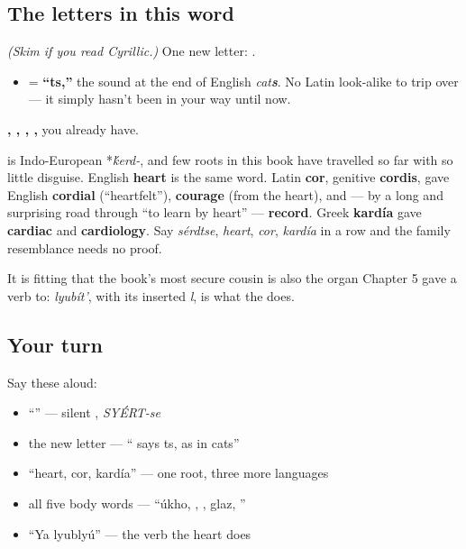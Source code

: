 \subsection*{The letters in this word}
\emph{(Skim if you read Cyrillic.)} One new letter: \textbf{}.

\begin{itemize}
\raggedright
  \item \textbf{} = \textbf{\textquotedblleft{}ts,\textquotedblright{}} the sound at the end of English \emph{cat\textbf{s}}. No Latin look-alike to trip over — it simply hasn't been in your way until now.
\end{itemize}

\textbf{, , , , } you already have.

\begin{cousinweb}
\textbf{} is Indo-European *\emph{\'{k}erd-}, and few roots in this book have travelled so far with so little disguise. English \textbf{heart} is the same word. Latin \textbf{cor}, genitive \textbf{cordis}, gave English \textbf{cordial} (\textquotedblleft{}heartfelt\textquotedblright{}), \textbf{courage} (from the heart), and — by a long and surprising road through \textquotedblleft{}to learn by heart\textquotedblright{} — \textbf{record}. Greek \textbf{kardía} gave \textbf{cardiac} and \textbf{cardiology}. Say \emph{sérdtse}, \emph{heart}, \emph{cor}, \emph{kardía} in a row and the family resemblance needs no proof.

It is fitting that the book's most secure cousin is also the organ Chapter 5 gave a verb to: \emph{lyubít'}, with its inserted \emph{l}, is what the \emph{} does.
\end{cousinweb}

\subsection*{Your turn}
Say these aloud:

\begin{itemize}
\raggedright
  \item \textquotedblleft{}\textquotedblright{} — silent , \emph{SYÉRT-se}
  \item the new letter — \textquotedblleft{} says ts, as in cats\textquotedblright{}
  \item \textquotedblleft{}heart, cor, kardía\textquotedblright{} — one root, three more languages
  \item all five body words — \textquotedblleft{}úkho, , , glaz, \textquotedblright{}
  \item \textquotedblleft{}Ya lyublyú\textquotedblright{} — the verb the heart does
\end{itemize}

